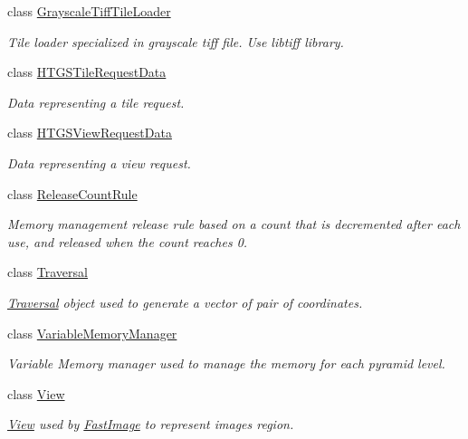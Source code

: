 \begin{DoxyCompactItemize}
class \hyperlink{classfi_1_1GrayscaleTiffTileLoader}{Grayscale\+Tiff\+Tile\+Loader}
\begin{DoxyCompactList}\small\item\em Tile loader specialized in grayscale tiff file. Use libtiff library. \end{DoxyCompactList}\item 
class \hyperlink{classfi_1_1HTGSTileRequestData}{H\+T\+G\+S\+Tile\+Request\+Data}
\begin{DoxyCompactList}\small\item\em Data representing a tile request. \end{DoxyCompactList}\item 
class \hyperlink{classfi_1_1HTGSViewRequestData}{H\+T\+G\+S\+View\+Request\+Data}
\begin{DoxyCompactList}\small\item\em Data representing a view request. \end{DoxyCompactList}\item 
class \hyperlink{classfi_1_1ReleaseCountRule}{Release\+Count\+Rule}
\begin{DoxyCompactList}\small\item\em Memory management release rule based on a count that is decremented after each use, and released when the count reaches 0. \end{DoxyCompactList}\item 
class \hyperlink{classfi_1_1Traversal}{Traversal}
\begin{DoxyCompactList}\small\item\em \hyperlink{classfi_1_1Traversal}{Traversal} object used to generate a vector of pair of coordinates. \end{DoxyCompactList}\item 
class \hyperlink{classfi_1_1VariableMemoryManager}{Variable\+Memory\+Manager}
\begin{DoxyCompactList}\small\item\em Variable Memory manager used to manage the memory for each pyramid level. \end{DoxyCompactList}\item 
class \hyperlink{classfi_1_1View}{View}
\begin{DoxyCompactList}\small\item\em \hyperlink{classfi_1_1View}{View} used by \hyperlink{classfi_1_1FastImage}{Fast\+Image} to represent image\textquotesingle{}s region. \end{DoxyCompactList}\item 

\end{DoxyCompactItemize}
